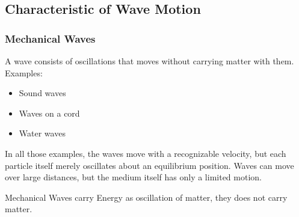 \documentclass[]{beamer}
\begin{document}
\subsection{Characteristic of Wave Motion}

\begin{frame}
\frametitle{Mechanical Waves}

A wave consists of oscillations that moves without carrying matter with them. Examples:
\vspace{3mm}

\pause

\begin{itemize}
\item Sound waves
\pause
\item Waves on a cord
\pause
\item Water waves
\end{itemize}
\vspace{3mm}
\pause
In all those examples, the waves move with a recognizable velocity, but each particle itself merely oscillates about an equilibrium position. Waves can move over large distances, 
but the medium  itself has only a limited motion. 

\vspace{3mm}
\pause
Mechanical Waves carry  Energy as oscillation of matter, they does not carry matter.

\vspace{3mm}

  \end{frame}
\end{document}
